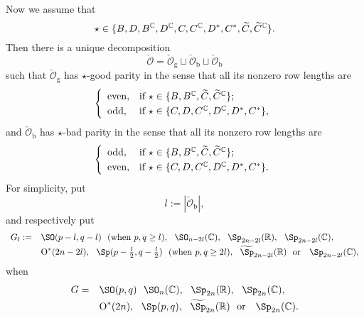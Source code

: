 \documentclass[12pt,a4paper]{amsart}
\def\abs#1{\left|{#1}\right|}
\newcommand{\CO}{{\mathcal {O}}}
\newcommand{\oO}{\operatorname{O}}
\newcommand{\R}{\mathbb R}
\numberwithin{equation}{section}
\theoremstyle{remark}
\begin{document}
Now we assume that  
\[
\star\in \{ B, D,   B^{\mathbb{C}}, D^{\mathbb{C}}, C, C^{\mathbb{C}}, D^*, C^*, \widetilde C, \widetilde C^{\mathbb{C}}\}. 
\]
Then there is a unique decomposition  
 \[
   \check \CO=\check \CO_{\mathrm g} \sqcup \check \CO_{\mathrm b}\sqcup \check \CO_{\mathrm b}
 \]
 such that $\check \CO_{\mathrm g}$ has $\star$-good parity in the sense that all its nonzero row lengths are
 \[
 \left\{
     \begin{array}{ll}
       \textrm{even}, &\hbox{if $\star\in \{B, B^\C, \widetilde C, \widetilde C^\C\}$}; \smallskip\\
         \textrm{odd}, &\hbox{if $\star\in \{C, D, C^\C, D^\C, D^*, C^*\}$},
          \end{array}
   \right.
   \]
   and $\check \CO_{\mathrm b}$ has $\star$-bad parity in the sense that 
   all its nonzero row lengths are
 \[
 \left\{
     \begin{array}{ll}
       \textrm{odd}, &\hbox{if  $\star\in \{B, B^\C, \widetilde C, \widetilde C^\C\}$}; \smallskip\\
         \textrm{even}, &\hbox{if  $\star\in \{C, D, C^\C, D^\C, D^*, C^*\}$}.
          \end{array}
   \right.
   \]
For simplicity, put
\[
  l:=\abs{\check \CO_{\mathrm b}}, 
\]
and respectively put
\[
 \begin{array}{rl}
    G_l:=  & \SO(p-l,q-l)\ \  (\textrm{when $p,q\geq l$}),   \ \     \SO_{n-2l}(\C),  \  \   \Sp_{2n-2l}(\R), \  \ \Sp_{2n-2l}(\C), \smallskip \\
  & \oO^*(2n-2l), \ \  \Sp(p-\frac{l}{2},q-\frac{l}{2}) \ \  (\textrm{when $p,q\geq 2l$}),  \ \   \widetilde \Sp_{2n-2l}(\R) \ \ \textrm{or }  \ \  \Sp_{2n-2l}(\C),
     \end{array}
\]
when \[
 \begin{array}{rl}
    G=  & \SO(p,q)   \ \     \SO_{n}(\C),  \  \   \Sp_{2n}(\R), \  \ \Sp_{2n}(\C), \smallskip \\
  & \oO^*(2n), \ \  \Sp(p,q),  \ \   \widetilde \Sp_{2n}(\R) \ \ \textrm{or }  \ \  \Sp_{2n}(\C).
     \end{array}
\]
\end{document}
